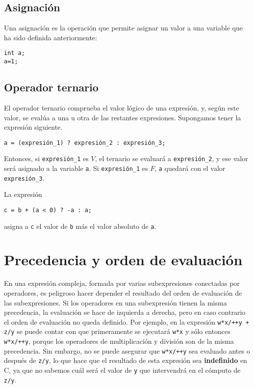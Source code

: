 \subsection{Asignación}
Una asignación es la operación que permite asignar un valor a una variable que ha sido definida anteriormente: 
\begin{lstlisting}
int a;
a=1;
\end{lstlisting}

\subsection{Operador ternario}
El operador ternario comprueba el valor lógico de una expresión, y, según este valor, se evalúa a una u otra de las restantes expresiones. Supongamos tener la expresión siguiente.

\begin{lstlisting}
a = (expresión_1) ? expresión_2 : expresión_3;    
\end{lstlisting}

Entonces, si \lstinline{expresión_1} es $V$, el ternario se evaluará a \lstinline{expresión_2}, y ese valor será asignado a la variable \lstinline{a}. Si \lstinline{expresión_1} es $F$, \lstinline{a} quedará con el valor \lstinline{expresión_3}.

\begin{ejemplo}
La expresión
\begin{lstlisting}
c = b + (a < 0) ? -a : a;   
\end{lstlisting}      
asigna a \lstinline{c} el valor de \lstinline{b} más el valor absoluto de \lstinline{a}.
\end{ejemplo}

\section{Precedencia y orden de evaluación}

En una expresión compleja, formada por varias subexpresiones conectadas por operadores, es peligroso hacer depender el resultado del orden de evaluación de las subexpresiones. Si los operadores en una subexpresión tienen la misma precedencia, la evaluación se hace de izquierda a derecha, pero en caso contrario el orden de evaluación no queda definido. 
Por ejemplo, en la expresión \lstinline{w*x/++y + z/y} se puede contar con que primeramente se ejecutará \lstinline{w*x} y sólo entonces \lstinline{w*x/++y}, porque los operadores de multiplicación y división son de la misma precedencia. Sin embargo, no se puede asegurar que \lstinline{w*x/++y} sea evaluado antes o después de \lstinline{z/y}, lo que hace que el resultado de esta expresión sea \textbf{indefinido} en C, ya que no sabemos cuál será el valor de \lstinline{y} que intervendrá en el cómputo de \lstinline{z/y}. 

